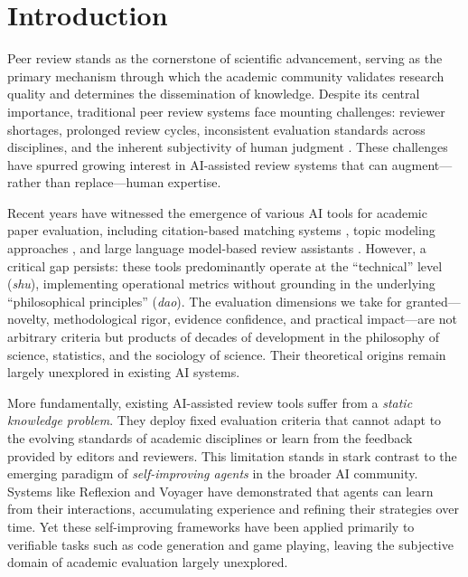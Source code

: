 \section{Introduction}

Peer review stands as the cornerstone of scientific advancement, serving as the primary mechanism through which the academic community validates research quality and determines the dissemination of knowledge. Despite its central importance, traditional peer review systems face mounting challenges: reviewer shortages, prolonged review cycles, inconsistent evaluation standards across disciplines, and the inherent subjectivity of human judgment \citep{mackenzie2021peer}. These challenges have spurred growing interest in AI-assisted review systems that can augment---rather than replace---human expertise.

Recent years have witnessed the emergence of various AI tools for academic paper evaluation, including citation-based matching systems \citep{kang2018peerread}, topic modeling approaches \citep{li2023reviewerfinder}, and large language model-based review assistants \citep{stanford2024ai}. However, a critical gap persists: these tools predominantly operate at the ``technical'' level (\textit{shu}), implementing operational metrics without grounding in the underlying ``philosophical principles'' (\textit{dao}). The evaluation dimensions we take for granted---novelty, methodological rigor, evidence confidence, and practical impact---are not arbitrary criteria but products of decades of development in the philosophy of science, statistics, and the sociology of science. Their theoretical origins remain largely unexplored in existing AI systems.

More fundamentally, existing AI-assisted review tools suffer from a \textit{static knowledge problem}. They deploy fixed evaluation criteria that cannot adapt to the evolving standards of academic disciplines or learn from the feedback provided by editors and reviewers. This limitation stands in stark contrast to the emerging paradigm of \textit{self-improving agents} in the broader AI community. Systems like Reflexion \citep{shinn2023reflexion} and Voyager \citep{wang2023voyager} have demonstrated that agents can learn from their interactions, accumulating experience and refining their strategies over time. Yet these self-improving frameworks have been applied primarily to verifiable tasks such as code generation and game playing, leaving the subjective domain of academic evaluation largely unexplored.

